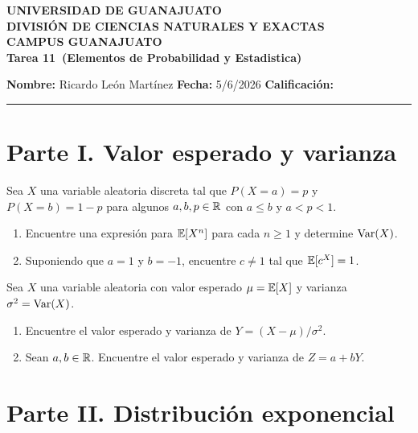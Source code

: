 \documentclass[12pt,a4paper]{article}
\newcommand{\alumno}{Ricardo León Martínez}
\newcommand{\materia}{Elementos de Probabilidad y Estadistica}
\newcommand{\tarea}{Tarea 11}
\newcommand{\fecha}{5/6/2026}
\begin{document}
    \begin{center}
        {\large\textbf{UNIVERSIDAD DE GUANAJUATO}}\\[0.3cm]
        {\normalsize\textbf{DIVISIÓN DE CIENCIAS NATURALES Y EXACTAS}}\\
        {\normalsize\textbf{CAMPUS GUANAJUATO}}\\[1cm]

        {\Large\textbf{\tarea\ (\materia)}}\\[1cm]
    \end{center}

    \noindent
    \textbf{Nombre:} \alumno 
    \hfill 
    \textbf{Fecha:} \fecha 
    \hfill 
    \textbf{Calificación:} \rule{3cm}{0.4pt}

    \vspace{0.3cm}

    \section*{Parte I. Valor esperado y varianza}

    \begin{mdframed}[style=mdpinkbox,frametitle={Ejercicio 1}]
        Sea $X$ una variable aleatoria discreta tal que $P(X=a)=p$ y $P(X=b)=1-p$ para algunos $a,b,p\in\mathbb{R}$ con $a\leq b$
        y $a\lt p\lt1$.
        \begin{enumerate}
            \item[(a)] Encuentre una expresión para $\mathbb{E}[X^{n}]$ para cada $n\geq1$ y determine $\operatorname{Var}(X)$.
            \item[(b)] Suponiendo que $a=1$ y $b=-1$, encuentre $c\neq1$ tal que $\mathbb{E}[c^{X}]=1$. 
        \end{enumerate}
    \end{mdframed}

    \begin{mdframed}[style=mdpinkbox,frametitle={Ejercicio 2}]
        Sea $X$ una variable aleatoria con valor esperado $\mu=\mathbb{E}[X]$ y varianza $\sigma^{2}=\operatorname{Var}(X)$.
        \begin{enumerate}
            \item[(a)] Encuentre el valor esperado y varianza de $Y=(X-\mu)/\sigma^{2}$.
            \item[(b)] Sean $a,b\in\mathbb{R}$. Encuentre el valor esperado y varianza de $Z=a+bY$.
        \end{enumerate}
    \end{mdframed}

    \section*{Parte II. Distribución exponencial}
\end{document}
